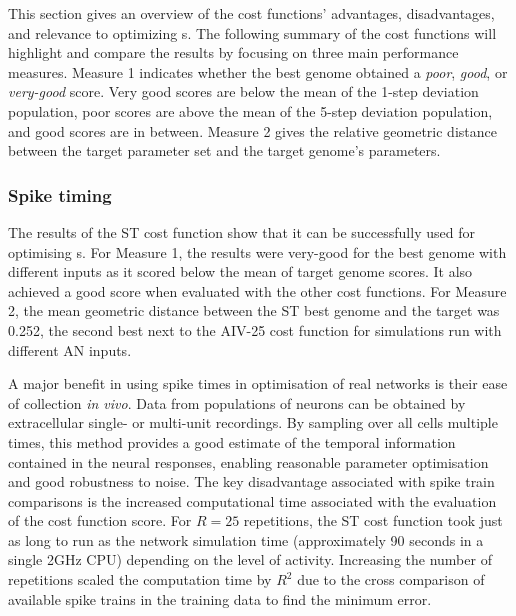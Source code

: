 This section gives an overview of the cost functions' advantages,
disadvantages, and relevance to optimizing {\BNN}s. The following summary
of the cost functions will highlight and compare the results by focusing on
three main performance measures.  Measure 1 indicates whether the best
genome obtained a \textit{poor}, \textit{good}, or \textit{very-good}
score. Very good scores are below the mean of the 1-step deviation
population, poor scores are above the mean of the 5-step deviation
population, and good scores are in between.  %
Measure 2 gives the relative geometric distance between the target
parameter set and the target genome's parameters.

\subsubsection{Spike timing}\label{sec:GA:spike-timing-summ}

The results of the ST cost function show that it can be successfully used
for optimising {\BNN}s.  For Measure 1, the results were very-good for the
best genome with different inputs as it scored below the mean of target
genome scores. It also achieved a good score when evaluated with the other
cost functions.  For Measure 2, the mean geometric distance between the ST
best genome and the target was 0.252, the second best next to the AIV-25
cost function for {\GA} simulations run with different AN inputs.

\smallskip{}

A major benefit in using spike times in optimisation of real networks is
their ease of collection \textit{in vivo}. Data from populations of neurons
can be obtained by extracellular single- or multi-unit recordings.  By
sampling over all cells multiple times, this method provides a good
estimate of the temporal information contained in the neural responses,
enabling reasonable parameter optimisation and good robustness to noise.
The key disadvantage associated with spike train comparisons is the
increased computational time associated with the evaluation of the cost
function score.  For $R=25$ repetitions, the ST cost function took just as
long to run as the {\CN} network simulation time (approximately 90 seconds
in a single 2GHz CPU) depending on the level of activity. Increasing the
number of repetitions scaled the computation time by $R^2$ due to the cross
comparison of available spike trains in the training data to find the
minimum error.

